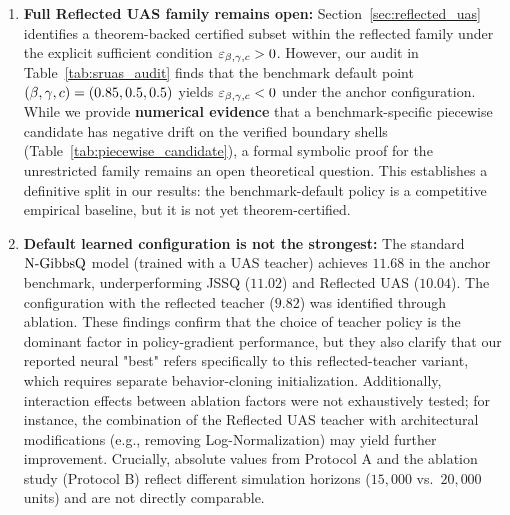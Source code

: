 \begin{enumerate}[label=\textbf{L\arabic*.}, leftmargin=2.2em]
\item \textbf{Full Reflected UAS family remains open:}
Section~\ref{sec:reflected_uas} identifies a theorem-backed certified subset within the reflected family under the explicit sufficient condition $\varepsilon_{\beta,\gamma,c}>0$.
However, our audit in Table~\ref{tab:sruas_audit} finds that the benchmark default point $(\beta, \gamma, c) = (0.85, 0.5, 0.5)$ yields $\varepsilon_{\beta,\gamma,c} < 0$ under the anchor configuration.
While we provide \textbf{numerical evidence} that a benchmark-specific piecewise candidate has negative drift on the verified boundary shells (Table~\ref{tab:piecewise_candidate}), a formal symbolic proof for the unrestricted family remains an open theoretical question. This establishes a definitive split in our results: the benchmark-default policy is a competitive empirical baseline, but it is not yet theorem-certified.

\item \textbf{Default learned configuration is not the strongest:}
The standard $\text{N-GibbsQ}$ model (trained with a UAS teacher) achieves $11.68$ in the anchor benchmark, underperforming JSSQ ($11.02$) and Reflected UAS ($10.04$).
The configuration with the reflected teacher ($9.82$) was identified through ablation.
These findings confirm that the choice of teacher policy is the dominant factor in policy-gradient performance, but they also clarify that our reported neural "best" refers specifically to this reflected-teacher variant, which requires separate behavior-cloning initialization. Additionally, interaction effects between ablation factors were not exhaustively tested; for instance, the combination of the Reflected UAS teacher with architectural modifications (e.g., removing Log-Normalization) may yield further improvement.
Crucially, absolute values from Protocol A and the ablation study (Protocol B) reflect different simulation horizons ($15{,}000$ vs.\ $20{,}000$ units) and are not directly comparable.


\end{enumerate}
